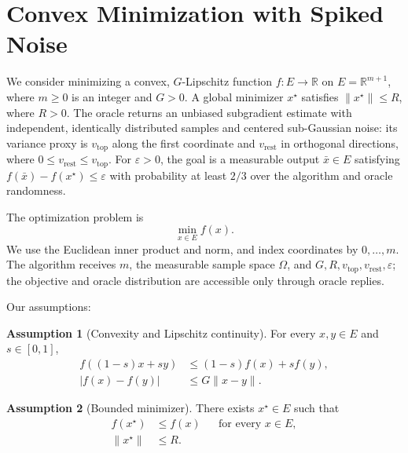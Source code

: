 \documentclass[10pt]{article}
\theoremstyle{definition}
\newtheorem{assumption}{Assumption}
\begin{document}
\section*{Convex Minimization with Spiked Noise}
We consider minimizing a convex, $G$-Lipschitz function $f:E\to\mathbb{R}$ on $E=\mathbb{R}^{m+1}$, where $m\geq0$ is an integer and $G>0$. A global minimizer $x^\star$ satisfies $\|x^\star\|\leq R$, where $R>0$. The oracle returns an unbiased subgradient estimate with independent, identically distributed samples and centered sub-Gaussian noise: its variance proxy is $v_{\mathrm{top}}$ along the first coordinate and $v_{\mathrm{rest}}$ in orthogonal directions, where $0\leq v_{\mathrm{rest}}\leq v_{\mathrm{top}}$. For $\varepsilon>0$, the goal is a measurable output $\bar{x}\in E$ satisfying $f(\bar{x})-f(x^\star)\leq\varepsilon$ with probability at least $2/3$ over the algorithm and oracle randomness.

The optimization problem is
\[
\min_{x\in E} f(x).
\]
We use the Euclidean inner product and norm, and index coordinates by $0,\ldots,m$. The algorithm receives $m$, the measurable sample space $\Omega$, and $G,R,v_{\mathrm{top}},v_{\mathrm{rest}},\varepsilon$; the objective and oracle distribution are accessible only through oracle replies.

Our assumptions:
\begin{assumption}[Convexity and Lipschitz continuity]
For every $x,y\in E$ and $s\in[0,1]$,
\[
\begin{aligned}
f((1-s)x+sy)&\leq(1-s)f(x)+sf(y),\\
|f(x)-f(y)|&\leq G\|x-y\|.
\end{aligned}
\]
\end{assumption}

\begin{assumption}[Bounded minimizer]
There exists $x^\star\in E$ such that
\[
\begin{aligned}
f(x^\star)&\leq f(x) &&\text{for every }x\in E,\\
\|x^\star\|&\leq R.
\end{aligned}
\]
\end{assumption}
\end{document}
